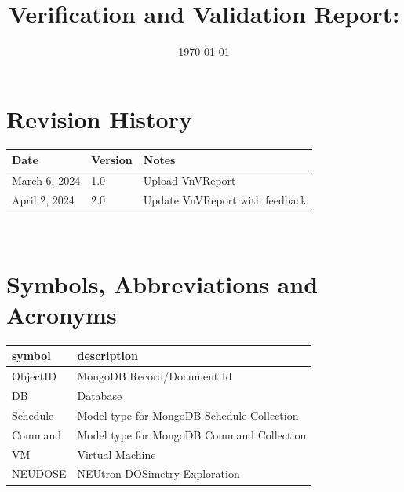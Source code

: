 \documentclass[12pt, titlepage]{article}
\begin{document}
\title{Verification and Validation Report: \progname} 
\author{\authname}
\date{\today}
	
\maketitle


\section{Revision History}

\begin{tabularx}{\textwidth}{p{3cm}p{2cm}X}
\toprule {\bf Date} & {\bf Version} & {\bf Notes}\\
\midrule
March 6, 2024 & 1.0 & Upload VnVReport\\
April 2, 2024 & 2.0 & Update VnVReport with feedback\\
\bottomrule
\end{tabularx}

~\newpage

\section{Symbols, Abbreviations and Acronyms}

\renewcommand{\arraystretch}{1.2}
\begin{tabular}{l l} 
  \toprule		
  \textbf{symbol} & \textbf{description}\\
  \midrule 
  ObjectID & MongoDB Record/Document Id\\
  DB & Database\\
  Schedule & Model type for MongoDB Schedule Collection \\
  Command & Model type for MongoDB Command Collection \\
  VM & Virtual Machine \\
  NEUDOSE & NEUtron DOSimetry Exploration \\
  \bottomrule
\end{tabular}\\


\newpage

\tableofcontents

\listoftables %

\listoffigures %
\end{document}
